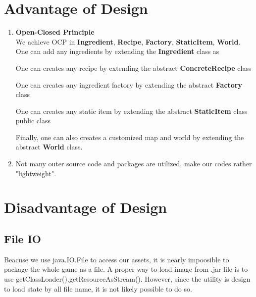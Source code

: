 




\section{Advantage of Design}
\begin{enumerate}
\item \textbf{Open-Closed Principle} \\
We achieve OCP in \textbf{Ingredient}, \textbf{Recipe}, \textbf{Factory}, \textbf{StaticItem}, \textbf{World}.
    One can add any ingredients by extending the \textbf{Ingredient} class as


One can creates any recipe by extending the abstract \textbf{ConcreteRecipe} class


One can creates any ingredient factory by extending the abstract \textbf{Factory} class


One can creates any static item by extending the abstract \textbf{StaticItem} class public class


Finally, one can also creates a customized map and world by extending the abstract \textbf{World} class.
\item Not many outer source code and packages are utilized, make our codes rather "lightweight".
\end{enumerate}

\section{Disadvantage of Design}
\subsection{File IO}
Beacuse we use java.IO.File to access our assets, it is nearly impoosible to package the whole game as a file.
A proper way to load image from .jar file is to use getClassLoader().getResourceAsStream(). However, since the utility is design to load state by
all file name, it is not likely possible to do so.

